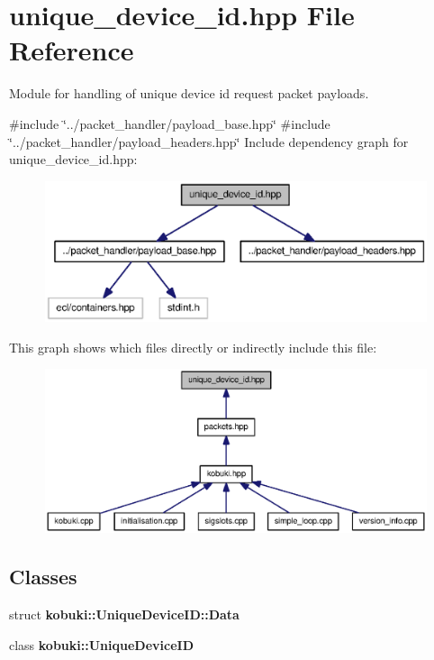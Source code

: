 \section{unique\-\_\-device\-\_\-id.\-hpp \-File \-Reference}
\label{unique__device__id_8hpp}


\-Module for handling of unique device id request packet payloads.  


{\ttfamily \#include \char`\"{}../packet\-\_\-handler/payload\-\_\-base.\-hpp\char`\"{}}\*
{\ttfamily \#include \char`\"{}../packet\-\_\-handler/payload\-\_\-headers.\-hpp\char`\"{}}\*
\-Include dependency graph for unique\-\_\-device\-\_\-id.\-hpp\-:
\nopagebreak
\begin{figure}[H]
\begin{center}
\leavevmode
\includegraphics[width=350pt]{unique__device__id_8hpp__incl}
\end{center}
\end{figure}
\-This graph shows which files directly or indirectly include this file\-:
\nopagebreak
\begin{figure}[H]
\begin{center}
\leavevmode
\includegraphics[width=350pt]{unique__device__id_8hpp__dep__incl}
\end{center}
\end{figure}
\subsection*{\-Classes}
\begin{DoxyCompactItemize}
\item 
struct {\bf kobuki\-::\-Unique\-Device\-I\-D\-::\-Data}
\item 
class {\bf kobuki\-::\-Unique\-Device\-I\-D}
\end{DoxyCompactItemize}
